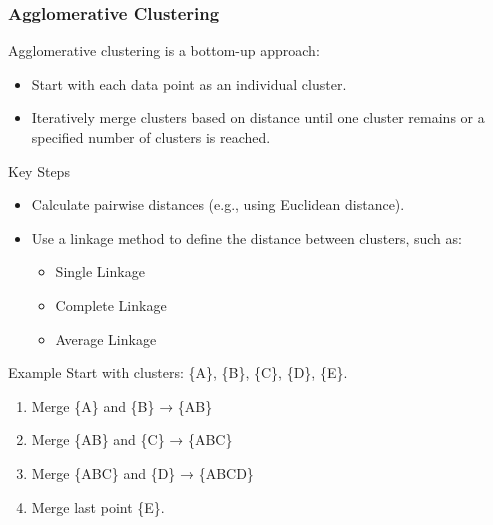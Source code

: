 \documentclass[aspectratio=169]{beamer}
\begin{document}
\begin{frame}
    \frametitle{Agglomerative Clustering}
    Agglomerative clustering is a bottom-up approach:
    \begin{itemize}
        \item Start with each data point as an individual cluster.
        \item Iteratively merge clusters based on distance until one cluster remains or a specified number of clusters is reached.
    \end{itemize}
    
    \begin{block}{Key Steps}
        \begin{itemize}
            \item Calculate pairwise distances (e.g., using Euclidean distance).
            \item Use a linkage method to define the distance between clusters, such as:
            \begin{itemize}
                \item Single Linkage
                \item Complete Linkage
                \item Average Linkage
            \end{itemize}
        \end{itemize}
    \end{block}
    
    \begin{block}{Example}
        Start with clusters: \{A\}, \{B\}, \{C\}, \{D\}, \{E\}.
        \begin{enumerate}
            \item Merge \{A\} and \{B\} → \{AB\}
            \item Merge \{AB\} and \{C\} → \{ABC\}
            \item Merge \{ABC\} and \{D\} → \{ABCD\}
            \item Merge last point \{E\}.
        \end{enumerate}
    \end{block}
\end{frame}
\end{document}
